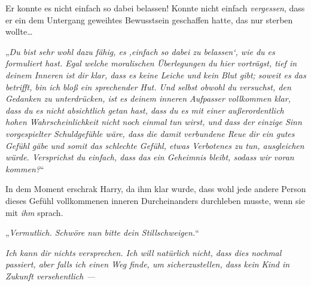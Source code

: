 Er konnte es nicht einfach so dabei belassen! Konnte nicht einfach \emph{vergessen}, dass er ein dem Untergang geweihtes Bewusstsein geschaffen hatte, das nur sterben wollte…

„\emph{Du bist sehr wohl dazu fähig, es ‚einfach so dabei zu belassen‘, wie du es formuliert hast. Egal welche moralischen Überlegungen du hier vorträgst, tief in deinem Inneren ist dir klar, dass es keine Leiche und kein Blut gibt; soweit es das betrifft, bin ich bloß ein sprechender Hut. Und selbst obwohl du versuchst, den Gedanken zu unterdrücken, ist es deinem inneren Aufpasser vollkommen klar, dass du es nicht absichtlich getan hast, dass du es mit einer außerordentlich hohen Wahrscheinlichkeit nicht noch einmal tun wirst, und dass der einzige Sinn vorgespielter Schuldgefühle wäre, dass die damit verbundene Reue dir ein gutes Gefühl gäbe und somit das schlechte Gefühl, etwas Verbotenes zu tun, ausgleichen würde. Versprichst du einfach, dass das ein Geheimnis bleibt, sodass wir voran kommen?}“

In dem Moment erschrak Harry, da ihm klar wurde, dass wohl jede andere Person dieses Gefühl vollkommenen inneren Durcheinanders durchleben musste, wenn sie mit \emph{ihm} sprach.

„\emph{Vermutlich. Schwöre nun bitte dein Stillschweigen.}“

\emph{Ich kann dir nichts versprechen. Ich will natürlich nicht, dass dies nochmal passiert, aber falls ich einen Weg finde, um sicherzustellen, dass kein Kind in Zukunft versehentlich —}

